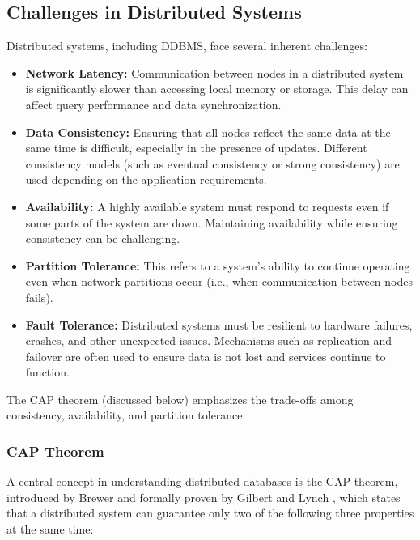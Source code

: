 \subsection{Challenges in Distributed Systems}
Distributed systems, including DDBMS, face several inherent challenges:
\begin{itemize}
  \item \textbf{Network Latency:} Communication between nodes in a distributed system is significantly slower than accessing local memory or storage.
    This delay can affect query performance and data synchronization.

  \item \textbf{Data Consistency:} Ensuring that all nodes reflect the same data at the same time is difficult, especially in the presence of updates.
    Different consistency models (such as eventual consistency or strong consistency) are used depending on the application requirements.

  \item \textbf{Availability:} A highly available system must respond to requests even if some parts of the system are down.
    Maintaining availability while ensuring consistency can be challenging.

  \item \textbf{Partition Tolerance:} This refers to a system's ability to continue operating even when network partitions occur (i.e., when communication between nodes fails).

  \item \textbf{Fault Tolerance:} Distributed systems must be resilient to hardware failures, crashes, and other unexpected issues.
    Mechanisms such as replication and failover are often used to ensure data is not lost and services continue to function.
\end{itemize}

The CAP theorem (discussed below) emphasizes the trade-offs among consistency, availability, and partition tolerance.

\subsubsection{CAP Theorem}
A central concept in understanding distributed databases is the CAP theorem, introduced by Brewer \parencite{brewerRobustDistributedSystems2000} and formally proven by Gilbert and Lynch \parencite{gilbertBrewersConjectureFeasibility2002}, which states that a distributed system can guarantee only two of the following three properties at the same time:


